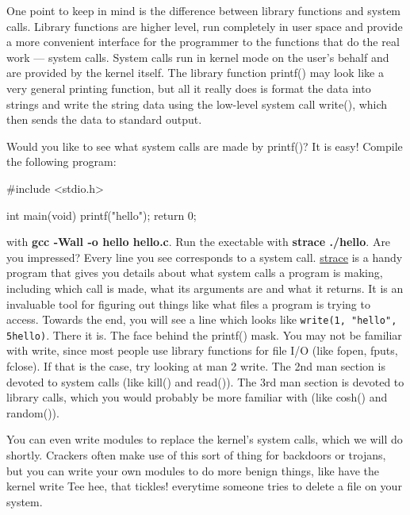 \documentclass[10pt, oneside]{book}
\begin{document}
One point to keep in mind is the difference between library functions and system calls. Library functions are higher level, run completely in user space and provide a more convenient interface for the programmer to the functions that do the real work --- system calls.
System calls run in kernel mode on the user's behalf and are provided by the kernel itself.
The library function printf() may look like a very general printing function, but all it really does is format the data into strings and write the string data using the low-level system call write(), which then sends the data to standard output.

Would you like to see what system calls are made by printf()?
It is easy!
Compile the following program:

\begin{code}
#include <stdio.h>

int main(void)
{
    printf("hello");
    return 0;
}
\end{code}

with \textbf{gcc -Wall -o hello hello.c}.
Run the exectable with \textbf{strace ./hello}.
Are you impressed?
Every line you see corresponds to a system call.
\href{https://strace.io/}{strace} is a handy program that gives you details about what system calls a program is making, including which call is made, what its arguments are and what it returns.
It is an invaluable tool for figuring out things like what files a program is trying to access.
Towards the end, you will see a line which looks like \verb|write(1, "hello", 5hello)|.
There it is.
The face behind the printf() mask.
You may not be familiar with write, since most people use library functions for file I/O (like fopen, fputs, fclose).
If that is the case, try looking at man 2 write.
The 2nd man section is devoted to system calls (like kill() and read()).
The 3rd man section is devoted to library calls, which you would probably be more familiar with (like cosh() and random()).

You can even write modules to replace the kernel's system calls, which we will do shortly.
Crackers often make use of this sort of thing for backdoors or trojans, but you can write your own modules to do more benign things, like have the kernel write Tee hee, that tickles! everytime someone tries to delete a file on your system.
\end{document}
